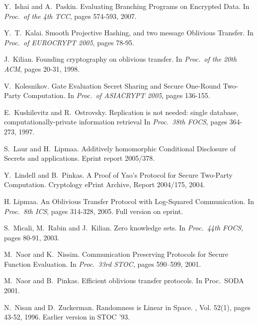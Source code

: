 \documentclass[11pt]{article}
\begin{document}
\begin{thebibliography}{10}
Y.~Ishai and A.~Paskin.
\newblock Evaluating Branching Programs on Encrypted Data.
\newblock In {\em Proc.\ of the 4th TCC}, pages 574-593, 2007.


Y.~T.~Kalai.
\newblock Smooth Projective Hashing, and two message Oblivious Transfer.
\newblock In {\em Proc.\ of EUROCRYPT 2005}, pages 78-95.

J.~Kilian.
\newblock Founding cryptography on oblivious transfer.
\newblock In {\em Proc.\ of the 20th ACM}, pages 20-31, 1998.


V.~Kolesnikov.
\newblock  Gate Evaluation Secret Sharing and Secure
One-Round Two-Party Computation.
\newblock In {\em Proc.\ of ASIACRYPT 2005}, pages 136-155.


E.~Kushilevitz and R.~Ostrovsky.
\newblock Replication is not needed: single database, computationally-private
          information retrieval
\newblock In {\em Proc.\ 38th FOCS}, pages 364-273, 1997.

S.~Laur and H.~Lipmaa.
\newblock Additively homomorphic Conditional Disclosure of Secrets and applications.
\newblock Eprint report 2005/378.

Y.~Lindell and B.~Pinkas.
\newblock A Proof of Yao's Protocol for Secure Two-Party Computation.
\newblock Cryptology ePrint Archive, Report 2004/175, 2004.

H. Lipmaa.
\newblock An Oblivious Transfer Protocol with Log-Squared Communication.
\newblock In {\em Proc.\ 8th ICS}, pages 314-328, 2005. Full
version on eprint.

S.~Micali, M.~Rabin and J.~Kilian.
\newblock Zero knowledge sets.
\newblock In {\em Proc.\ 44th FOCS}, pages 80-91, 2003.

 M.~Naor and K.~Nissim.
\newblock Communication Preserving Protocols for Secure Function
Evaluation.
\newblock In {\em Proc.\ 33rd STOC}, pages 590--599, 2001.


 M.~Naor and B.~Pinkas.
\newblock Efficient oblivious transfer protocols.
\newblock In {Proc.\ SODA 2001}.

 N.~Nisan and D.~Zuckerman.
\newblock Randomness is Linear in Space.
, Vol. 52(1), pages 43-52, 1996.
\newblock Earlier version in STOC '93.



\end{thebibliography}
\end{document}
